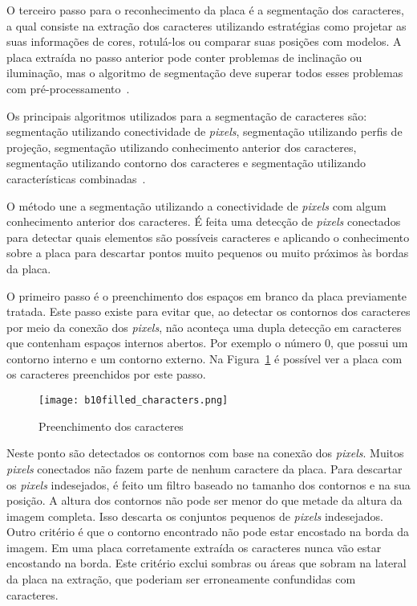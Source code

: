 O terceiro passo para o reconhecimento da placa é a segmentação dos caracteres,
a qual consiste na extração dos caracteres utilizando estratégias como projetar
as suas informações de cores, rotulá-los ou comparar suas posições com modelos.
A placa extraída no passo anterior pode conter problemas de inclinação ou
iluminação, mas o algoritmo de segmentação deve superar todos esses problemas
com pré-processamento~\cite{s2013automatic}.

Os principais algoritmos utilizados para a segmentação de caracteres são:
segmentação utilizando conectividade de \emph{pixels}, segmentação utilizando
perfis de projeção, segmentação utilizando conhecimento anterior dos caracteres,
segmentação utilizando contorno dos caracteres e segmentação utilizando
características combinadas~\cite{s2013automatic}.

O método une a segmentação utilizando a conectividade de \emph{pixels} com algum
conhecimento anterior dos caracteres. É feita uma detecção de \emph{pixels}
conectados para detectar quais elementos são possíveis caracteres e aplicando o
conhecimento sobre a placa para descartar pontos muito pequenos ou muito
próximos às bordas da placa.

O primeiro passo é o preenchimento dos espaços em branco da placa previamente
tratada. Este passo existe para evitar que, ao detectar os contornos dos
caracteres por meio da conexão dos \emph{pixels}, não aconteça uma dupla
detecção em caracteres que contenham espaços internos abertos. Por exemplo o
número 0, que possui um contorno interno e um contorno externo. Na
Figura~\ref{fig:preenchimento} é possível ver a placa com os caracteres
preenchidos por este passo.

\begin{figure}[H]
	\centering
	\texttt{[image: b10filled\_characters.png]}
	\caption{Preenchimento dos caracteres}
	\label{fig:preenchimento}
\end{figure}

Neste ponto são detectados os contornos com base na conexão dos \emph{pixels}.
Muitos \emph{pixels} conectados não fazem parte de nenhum caractere da placa.
Para descartar os \emph{pixels} indesejados, é feito um filtro baseado no
tamanho dos contornos e na sua posição. A altura dos contornos não pode ser
menor do que metade da altura da imagem completa. Isso descarta os conjuntos
pequenos de \emph{pixels} indesejados. Outro critério é que o contorno
encontrado não pode estar encostado na borda da imagem. Em uma placa
corretamente extraída os caracteres nunca vão estar encostando na borda. Este
critério exclui sombras ou áreas que sobram na lateral da placa na extração, que
poderiam ser erroneamente confundidas com caracteres.

